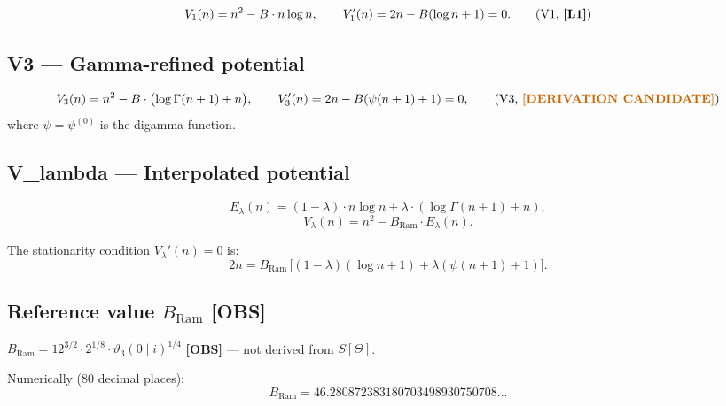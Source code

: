 \documentclass[12pt,a4paper]{article}
\theoremstyle{definition}
\theoremstyle{remark}
\newcommand{\OBS}{\textcolor{orange!70!black}{\textbf{[OBS]}}}
\newcommand{\DERIVCAND}{\textcolor{orange!80!black}{\textbf{[DERIVATION CANDIDATE]}}}
\newcommand{\Lone}{\textbf{[L1]}}
\newcommand{\BRam}{B_{\mathrm{Ram}}}
\begin{document}
\begin{equation}
  V_1(n) = n^2 - B \cdot n\log n,
  \qquad
  V_1'(n) = 2n - B(\log n + 1) = 0.
  \tag{V1, \Lone}
\end{equation}

\subsection{V3 — Gamma-refined potential}

\begin{equation}
  V_3(n) = n^2 - B\cdot\bigl(\log\Gamma(n+1) + n\bigr),
  \qquad
  V_3'(n) = 2n - B(\psi(n+1) + 1) = 0,
  \tag{V3, \DERIVCAND}
\end{equation}
where $\psi = \psi^{(0)}$ is the digamma function.

\subsection{V\_lambda — Interpolated potential}

\begin{equation}
  E_\lambda(n) = (1-\lambda)\cdot n\log n + \lambda\cdot(\log\Gamma(n+1) + n),
  \label{eq:Elambda}
\end{equation}
\begin{equation}
  V_\lambda(n) = n^2 - \BRam \cdot E_\lambda(n).
  \label{eq:Vlambda}
\end{equation}

The stationarity condition $V_\lambda'(n) = 0$ is:
\begin{equation}
  2n = \BRam\,\bigl[(1-\lambda)(\log n + 1) + \lambda(\psi(n+1) + 1)\bigr].
  \label{eq:stat_lambda}
\end{equation}

\subsection{Reference value $\BRam$ \OBS}

\begin{obsbox}
$\BRam = 12^{3/2} \cdot 2^{1/8} \cdot \vartheta_3(0\mid i)^{1/4}$
\quad \OBS{} — not derived from $S[\Theta]$.
\end{obsbox}

Numerically (80 decimal places):
\begin{equation}
  \BRam = 46.280872383180703498930750708\ldots
  \label{eq:BRam_value}
\end{equation}

\end{document}
